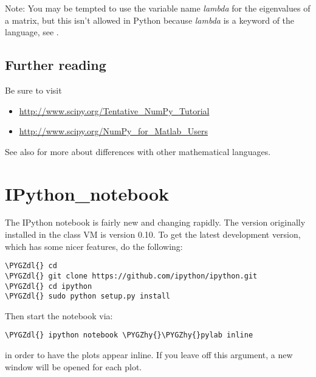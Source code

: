 \documentclass[letterpaper,10pt,english]{sphinxmanual}
\def\PYGZdl{\char`\$}
\def\PYGZhy{\char`\-}
\begin{document}
Note: You may be tempted to use the variable name \emph{lambda} for the eigenvalues
of a matrix, but this isn't allowed in Python because \emph{lambda} is a keyword
of the language, see {\hyperref[python_functions:lambda\string-functions]{}}.


\subsection{Further reading}
\label{numerical_python:further-reading}
Be sure to visit
\begin{itemize}
\item {} 
\url{http://www.scipy.org/Tentative\_NumPy\_Tutorial}

\item {} 
\url{http://www.scipy.org/NumPy\_for\_Matlab\_Users}

\end{itemize}

See also \label{numerical_python:id7}{\hyperref[biblio:numpy\string-pros\string-cons]{}} for more about differences with other
mathematical languages.


\section{IPython\_notebook}
\label{ipython_notebook:ipython-notebook}\label{ipython_notebook::doc}\label{ipython_notebook:id1}
The IPython notebook is fairly new and changing rapidly.  The version
originally installed in the class VM is version 0.10.  To get the latest
development version, which has some nicer features, do the following:

\begin{Verbatim}[commandchars=\\\{\}]
\PYGZdl{} cd
\PYGZdl{} git clone https://github.com/ipython/ipython.git
\PYGZdl{} cd ipython
\PYGZdl{} sudo python setup.py install
\end{Verbatim}

Then start the notebook via:

\begin{Verbatim}[commandchars=\\\{\}]
\PYGZdl{} ipython notebook \PYGZhy{}\PYGZhy{}pylab inline
\end{Verbatim}

in order to have the plots appear inline.  If you leave off this argument, a
new window will be opened for each plot.
\end{document}
